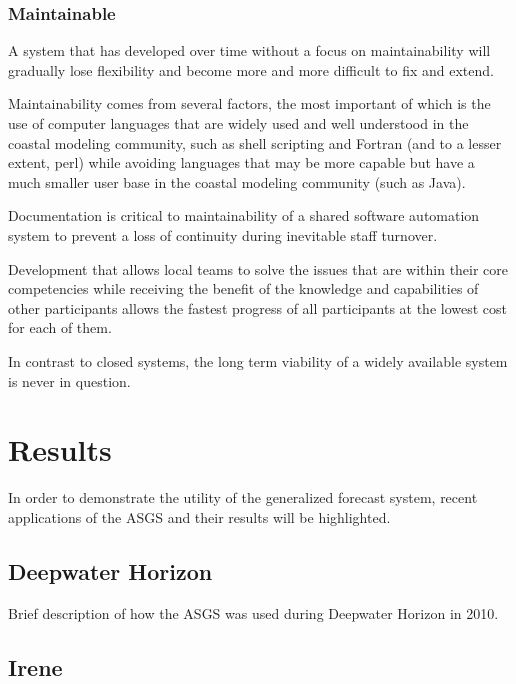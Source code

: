 \documentclass[12pt]{article}
\begin{document}
\subsubsection{Maintainable}

A system that has developed over time without a focus on 
maintainability will gradually lose flexibility and become more and 
more difficult to fix and extend. 

Maintainability comes from several factors, the most important of 
which is the use of computer languages that are widely used and well 
understood in the coastal modeling community, such as shell 
scripting and Fortran (and to a lesser extent, perl) while avoiding 
languages that may be more capable but have a much smaller user base 
in the coastal modeling community (such as Java).  

Documentation is critical to maintainability of a shared software 
automation system to prevent a loss of continuity during inevitable 
staff turnover.

Development that allows local teams to solve the issues that are 
within their core competencies while receiving the benefit of the 
knowledge and capabilities of other participants allows the fastest
progress of all participants at the lowest cost for each of them.

In contrast to closed systems, the long term viability of a widely
available system is never in question.  

\section{Results}

In order to demonstrate the utility of the generalized forecast 
system, recent applications of the ASGS and their results will be 
highlighted.

\subsection{Deepwater Horizon}

Brief description of how the ASGS was used during Deepwater Horizon in 2010.

\subsection{Irene}
\end{document}

